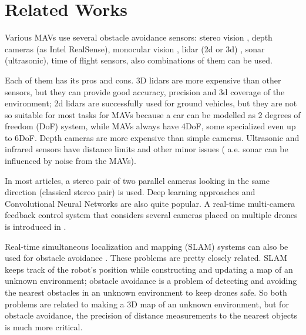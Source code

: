\section{Related Works}
Various MAVs use several obstacle avoidance sensors: stereo vision \cite{Ruf2018}, depth cameras (as Intel RealSense), monocular vision \cite{Mejias2010}, lidar (2d or 3d) \cite{Ramasamy2016}, sonar (ultrasonic), time of flight sensors, also combinations of them can be used. 

Each of them has its pros and cons. 
3D lidars are more expensive than other sensors, but they can provide good accuracy, precision and 3d coverage of the environment; 2d lidars are successfully used for ground vehicles, but they are not so suitable for most tasks for MAVs because a car can be modelled as 2 degrees of freedom (DoF) system, while MAVs always have 4DoF, some specialized even up to 6DoF. 
Depth cameras are more expensive than simple cameras. Ultrasonic and infrared sensors have distance limits and other minor issues ( a.e. sonar can be influenced by noise from the MAVs). 

In most articles, a stereo pair of two parallel cameras looking in the same direction (classical stereo pair) \cite{Lin2021} is used.
Deep learning approaches \cite{Back2020, FragaLamas2019, Park2020, Roghair2021} and Convolutional Neural Networks \cite{Yu2013, Ma2020} are also quite popular.
A real-time multi-camera feedback control system that considers several cameras placed on multiple drones is introduced in \cite{He2021}.

Real-time simultaneous localization and mapping (SLAM) systems can also be used for obstacle avoidance \cite{Moreno2014}. 
These problems are pretty closely related. 
SLAM keeps track of the robot's position while constructing and updating a map of an unknown environment; obstacle avoidance is a problem of detecting and avoiding the nearest obstacles in an unknown environment to keep drones safe.
So both problems are related to making a 3D map of an unknown environment, but for obstacle avoidance, the precision of distance measurements to the nearest objects is much more critical.

